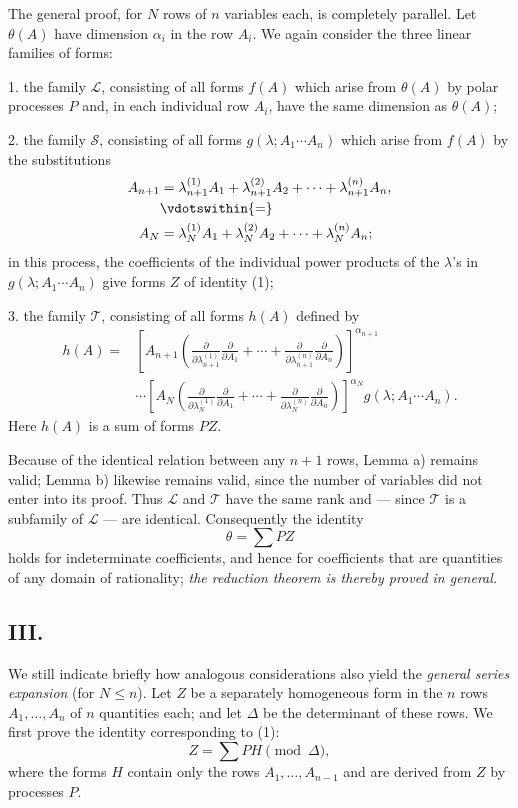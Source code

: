 The general proof, for $N$ rows of $n$ variables each, is completely parallel. Let $\theta(A)$ have dimension $\alpha_i$ in the row $A_i$. We again consider the three linear families of forms:

1. the family $\mathcal L$, consisting of all forms $f(A)$ which arise from $\theta(A)$ by polar processes $P$ and, in each individual row $A_i$, have the same dimension as $\theta(A)$;

2. the family $\mathcal S$, consisting of all forms $g(\lambda;A_1\cdots A_n)$ which arise from $f(A)$ by the substitutions
\[
\begin{aligned}
 A_{n+1}&=\lambda_{n+1}^{(1)}A_1+\lambda_{n+1}^{(2)}A_2+
        \cdots+\lambda_{n+1}^{(n)}A_n,\\
 &\vdotswithin{=}\\
 A_N&=\lambda_N^{(1)}A_1+\lambda_N^{(2)}A_2+
        \cdots+\lambda_N^{(n)}A_n;
\end{aligned}
\]
in this process, the coefficients of the individual power products of the $\lambda$'s in $g(\lambda;A_1\cdots A_n)$ give forms $Z$ of identity (1);

3. the family $\mathcal T$, consisting of all forms $h(A)$ defined by
\[
\begin{aligned}
 h(A)=&\left[A_{n+1}\left(
 \frac{\partial}{\partial\lambda_{n+1}^{(1)}}\frac{\partial}{\partial A_1}
 +\cdots+
 \frac{\partial}{\partial\lambda_{n+1}^{(n)}}\frac{\partial}{\partial A_n}\right)\right]^{\alpha_{n+1}} \\
&\cdots
\left[A_N\left(
 \frac{\partial}{\partial\lambda_N^{(1)}}\frac{\partial}{\partial A_1}
 +\cdots+
 \frac{\partial}{\partial\lambda_N^{(n)}}\frac{\partial}{\partial A_n}\right)\right]^{\alpha_N}
 g(\lambda;A_1\cdots A_n).
\end{aligned}
\]
Here $h(A)$ is a sum of forms $PZ$.

Because of the identical relation between any $n+1$ rows, Lemma a) remains valid; Lemma b) likewise remains valid, since the number of variables did not enter into its proof. Thus $\mathcal L$ and $\mathcal T$ have the same rank and --- since $\mathcal T$ is a subfamily of $\mathcal L$ --- are identical. Consequently the identity
\[
  \theta=\sum PZ
\]
holds for indeterminate coefficients, and hence for coefficients that are quantities of any domain of rationality; \emph{the reduction theorem is thereby proved in general.}

\subsection*{III.}
We still indicate briefly how analogous considerations also yield the \emph{general series expansion} (for $N\le n$). Let $Z$ be a separately homogeneous form in the $n$ rows $A_1,
\ldots,A_n$ of $n$ quantities each; and let $\Delta$ be the determinant of these rows. We first prove the identity corresponding to (1):
\begin{equation}
  Z=\sum PH \pmod{\Delta},
\tag{2}
\end{equation}
where the forms $H$ contain only the rows $A_1,
\ldots,A_{n-1}$ and are derived from $Z$ by processes $P$.


